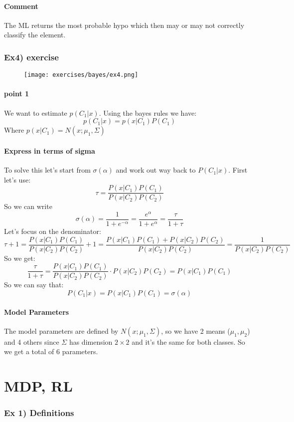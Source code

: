 \paragraph{Comment}
The ML returns the most probable hypo which then may or may not correctly classify the element.

\subsubsection{Ex4) exercise}
\begin{figure}[H]
    \centering
    \texttt{[image: exercises/bayes/ex4.png]}
\end{figure}

\paragraph{point 1}
We want to estimate $p(C_1|x)$. Using the bayes rules we have:
$$p(C_1|x)=p(x|C_1)P(C_1)$$
Where $p(x|C_1)=N(x;\mu_1, \Sigma)$

\paragraph{Express in terms of sigma}
To solve this let's start from $\sigma(\alpha)$ and work out way back to $P(C_1|x)$. First let's use:
$$\tau=\frac{P(x|C_1)P(C_1)}{P(x|C_2)P(C_2)}$$
So we can write
$$\sigma(\alpha)=\frac{1}{1+e^{-\alpha}}=\frac{e^{\alpha}}{1+e^{\alpha}}=\frac{\tau}{1+\tau}$$
Let's focus on the denominator:
$$\tau+1=\frac{P(x|C_1)P(C_1)}{P(x|C_2)P(C_2)}+1=\frac{P(x|C_1)P(C_1)+P(x|C_2)P(C_2)}{P(x|C_2)P(C_2)}=\frac{1}{P(x|C_2)P(C_2)}$$
So we get:
$$\frac{\tau}{1+\tau}=\frac{P(x|C_1)P(C_1)}{P(x|C_2)P(C_2)}\cdot P(x|C_2)P(C_2)=P(x|C_1)P(C_1)$$
So we can say that:
$$P(C_1|x)=P(x|C_1)P(C_1)=\sigma(\alpha)$$

\paragraph{Model Parameters}
The model parameters are defined by $N(x;\mu_1, \Sigma)$, so we have 2 means ($\mu_1,\mu_2$) and 4 others since $\Sigma$ has dimension $2 \times 2$ and it's the same for both classes. So we get a total of 6 parameters.

\section{MDP, RL}
\subsubsection{Ex 1) Definitions}

